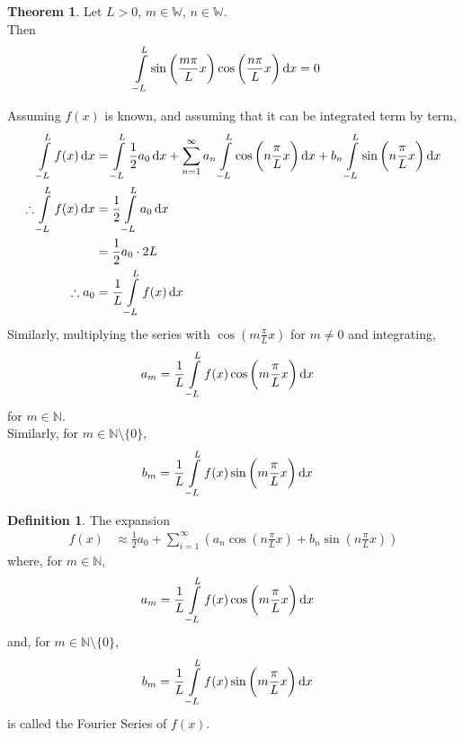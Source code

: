 \documentclass[fleqn, a4paper, 12pt, twoside]{article}
\theoremstyle{definition}
\newtheorem{definition}{Definition}
\theoremstyle{theorem}
\newtheorem{theorem}{Theorem}
\begin{document}
\begin{theorem}
	Let $L > 0$, $m \in \mathbb{W}$, $n \in \mathbb{W}$.\\
	Then
	\begin{align*}
		\int\limits_{-L}^{L} \sin\left( \frac{m \pi}{L} x \right) \cos\left( \frac{n \pi}{L} x \right) \dif x & = 0
	\end{align*}
\end{theorem}

Assuming $f(x)$ is known, and assuming that it can be integrated term by term,
\begin{align*}
	\int\limits_{-L}^{L} f(x) \dif x            & = \int\limits_{-L}^{L} \frac{1}{2} a_0 \dif x + \sum_{n = 1}^{\infty} a_n \int\limits_{-L}^{L} \cos\left( n \frac{\pi}{L} x \right) \dif x + b_n \int\limits_{-L}^{L} \sin\left( n \frac{\pi}{L} x \right) \dif x \\
	\therefore \int\limits_{-L}^{L} f(x) \dif x & = \frac{1}{2} \int\limits_{-L}^{L} a_0 \dif x                                                                                                                                                                     \\
                                                    & = \frac{1}{2} a_0 \cdot 2 L                                                                                                                                                                                       \\
	\therefore a_0                              & = \frac{1}{L} \int\limits_{-L}^{L} f(x) \dif x
\end{align*}
Similarly, multiplying the series with $\cos\left( m \frac{\pi}{L} x \right)$ for $m \neq 0$ and integrating,
\begin{align*}
	a_m & = \frac{1}{L} \int\limits_{-L}^{L} f(x) \cos\left( m \frac{\pi}{L} x \right) \dif x
\end{align*}
for $m \in \mathbb{N}$.\\
Similarly, for $m \in \mathbb{N} \setminus \{0\}$,
\begin{align*}
	b_m & = \frac{1}{L} \int\limits_{-L}^{L} f(x) \sin\left( m \frac{\pi}{L} x \right) \dif x
\end{align*}

\begin{definition}
	The expansion
	\begin{align*}
		f(x) & \approx \frac{1}{2} a_0 + \sum\limits_{i = 1}^{\infty} \left( a_n \cos\left( n \frac{\pi}{L} x \right) + b_n \sin\left( n \frac{\pi}{L} x \right) \right)
	\end{align*}
	where, for $m \in \mathbb{N}$,
	\begin{align*}
		a_m & = \frac{1}{L} \int\limits_{-L}^{L} f(x) \cos\left( m \frac{\pi}{L} x \right) \dif x
	\end{align*}
	and, for $m \in \mathbb{N} \setminus \{0\}$,
	\begin{align*}
		b_m & = \frac{1}{L} \int\limits_{-L}^{L} f(x) \sin\left( m \frac{\pi}{L} x \right) \dif x
	\end{align*}
	is called the Fourier Series of $f(x)$.
\end{definition}
\end{document}

